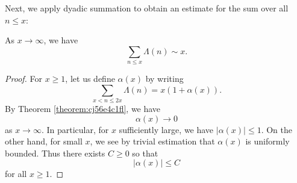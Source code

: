\documentclass[reqno]{amsart}  \numberwithin{theorem}{section} \numberwithin{equation}{section}
\begin{document}
Next, we apply dyadic summation to obtain an estimate for the sum over all $n \leq x$:
\begin{theorem}\label{theorem:cj56e5hu01}
  As $x \rightarrow \infty$, we have
  \begin{equation}\label{eq:cj56fbgld4}
    \sum_{n \leq x} \Lambda (n) \sim x.
  \end{equation}
\end{theorem}
\begin{proof}
  For $x \geq 1$, let us define $\alpha(x)$ by writing
  \begin{equation}\label{eq:cj56e4fgbu}
    \sum_{x < n \leq 2 x} \Lambda(n) = x (1 + \alpha (x)).
  \end{equation}
  By Theorem \ref{theorem:cj56e4c1fl}, we have
  \begin{equation}\label{eq:cj56e4jf1z}
    \alpha(x) \rightarrow 0
  \end{equation}
  as $x \rightarrow \infty$.  In particular, for $x$ sufficiently large, we have $\lvert \alpha(x) \rvert \leq 1$.  On the other hand, for small $x$, we see by trivial estimation that $\alpha(x)$ is uniformly bounded.  Thus there exists $C \geq 0$ so that
  \begin{equation}\label{eq:cj56e4jjez}
    \lvert \alpha(x) \rvert \leq C
  \end{equation}
  for all $x \geq 1$.


\end{proof}
\end{document}
